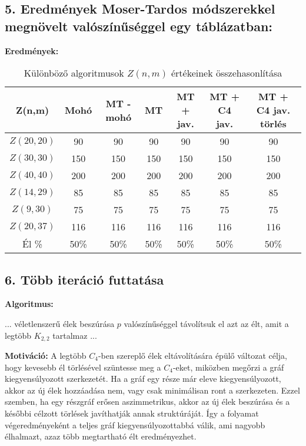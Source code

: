 \documentclass[12pt,a4paper]{article}
\begin{document}
\subsection*{5. Eredmények Moser-Tardos módszerekkel megnövelt valószínűséggel egy táblázatban:}

\textbf{Eredmények:} 

\begin{table}[H]
\centering
\begin{tabular}{|c|c|c|c|c|c|c|}
\hline
\textbf{Z(n,m)} & \textbf{Mohó} & \textbf{MT - mohó} & \textbf{MT} & \textbf{MT + jav.} & \textbf{MT + C4 jav.} & \textbf{MT + C4 jav. törlés} \\
\hline
$Z(20,20)$ & 90 & 90 & 90 & 90 & 90 & 90 \\
$Z(30,30)$ & 150 & 150 & 150 & 150 & 150 & 150 \\
$Z(40,40)$ & 200 & 200 & 200 & 200 & 200 & 200 \\
$Z(14,29)$ & 85 & 85 & 85 & 85 & 85 & 85 \\
$Z(9,30)$  & 75 & 75 & 75 & 75 & 75 & 75 \\
$Z(20,37)$ & 116 & 116 & 116 & 116 & 116 & 116 \\
\hline
Él \% & 50\% & 50\% & 50\% & 50\% & 50\% & 50\% \\
\hline
\end{tabular}
\caption{Különböző algoritmusok $Z(n,m)$ értékeinek összehasonlítása}
\end{table}

\subsection*{6. Több iteráció futtatása}
\textbf{Algoritmus:}

\begin{algorithm}
\begin{algorithmic}[1]
    \State ...
        \State véletlenszerű élek beszúrása $p$ valószínűséggel
            \State távolítsuk el azt az $\text{élt}$, amit a legtöbb $K_{2,2}$ tartalmaz
        \EndWhile
    \EndFor
    \State ...
\end{algorithmic}
\end{algorithm}

\textbf{Motiváció:} A legtöbb $C_4$-ben szereplő élek eltávolítására épülő változat célja, hogy kevesebb él törlésével szüntesse meg a $C_4$-eket, miközben megőrzi a gráf kiegyensúlyozott szerkezetét. Ha a gráf egy része már eleve kiegyensúlyozott, akkor az új élek hozzáadása nem, vagy csak minimálisan ront a szerkezeten. Ezzel szemben, ha egy részgráf erősen aszimmetrikus, akkor az új élek beszúrása és a későbbi célzott törlések javíthatják annak struktúráját. Így a folyamat végeredményeként a teljes gráf kiegyensúlyozottabbá válik, ami nagyobb élhalmazt, azaz több megtartható élt eredményezhet.
\end{document}
